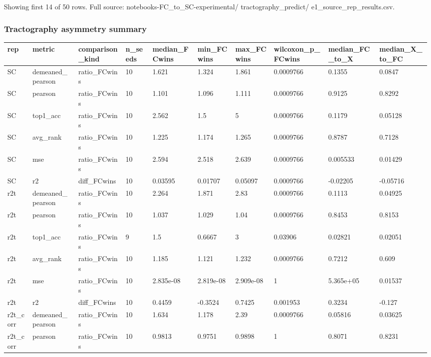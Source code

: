 Showing first 14 of 50 rows. Full source: notebooks-FC\_to\_SC-experimental/ tractography\_predict/ e1\_source\_rep\_results.csv.

\subsubsection{Tractography asymmetry summary}\label{tractography-asymmetry-summary}

{\def\LTcaptype{none} %
\begin{longtable}[]{@{}llllllllll@{}}
\toprule\noalign{}
rep & metric & comparison\_kind & n\_seeds & median\_FCwins & min\_FCwins & max\_FCwins & wilcoxon\_p\_FCwins & median\_FC\_to\_X & median\_X\_to\_FC \\
\midrule\noalign{}
\endhead
\bottomrule\noalign{}
\endlastfoot
SC & demeaned\_pearson & ratio\_FCwins & 10 & 1.621 & 1.324 & 1.861 & 0.0009766 & 0.1355 & 0.0847 \\
SC & pearson & ratio\_FCwins & 10 & 1.101 & 1.096 & 1.111 & 0.0009766 & 0.9125 & 0.8292 \\
SC & top1\_acc & ratio\_FCwins & 10 & 2.562 & 1.5 & 5 & 0.0009766 & 0.1179 & 0.05128 \\
SC & avg\_rank & ratio\_FCwins & 10 & 1.225 & 1.174 & 1.265 & 0.0009766 & 0.8787 & 0.7128 \\
SC & mse & ratio\_FCwins & 10 & 2.594 & 2.518 & 2.639 & 0.0009766 & 0.005533 & 0.01429 \\
SC & r2 & diff\_FCwins & 10 & 0.03595 & 0.01707 & 0.05097 & 0.0009766 & -0.02205 & -0.05716 \\
r2t & demeaned\_pearson & ratio\_FCwins & 10 & 2.264 & 1.871 & 2.83 & 0.0009766 & 0.1113 & 0.04925 \\
r2t & pearson & ratio\_FCwins & 10 & 1.037 & 1.029 & 1.04 & 0.0009766 & 0.8453 & 0.8153 \\
r2t & top1\_acc & ratio\_FCwins & 9 & 1.5 & 0.6667 & 3 & 0.03906 & 0.02821 & 0.02051 \\
r2t & avg\_rank & ratio\_FCwins & 10 & 1.185 & 1.121 & 1.232 & 0.0009766 & 0.7212 & 0.609 \\
r2t & mse & ratio\_FCwins & 10 & 2.835e-08 & 2.819e-08 & 2.909e-08 & 1 & 5.365e+05 & 0.01537 \\
r2t & r2 & diff\_FCwins & 10 & 0.4459 & -0.3524 & 0.7425 & 0.001953 & 0.3234 & -0.127 \\
r2t\_corr & demeaned\_pearson & ratio\_FCwins & 10 & 1.634 & 1.178 & 2.39 & 0.0009766 & 0.05816 & 0.03625 \\
r2t\_corr & pearson & ratio\_FCwins & 10 & 0.9813 & 0.9751 & 0.9898 & 1 & 0.8071 & 0.8231 \\
\end{longtable}
}

